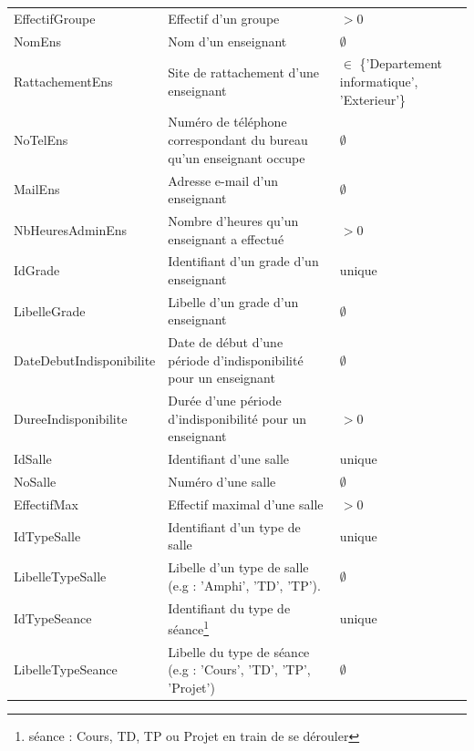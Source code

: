 \documentclass{article}
\begin{document}
\begin{tabular}{|p{4cm}|p{8cm}|p{5cm}|}
  EffectifGroupe & Effectif d'un groupe & $> 0$ \\

  NomEns & Nom d'un enseignant & $\emptyset$ \\

  RattachementEns & Site de rattachement d'une enseignant & $\in$ \{'Departement informatique', 'Exterieur'\} \\

  NoTelEns & Numéro de téléphone correspondant du bureau qu'un enseignant occupe & $\emptyset$ \\

  MailEns & Adresse e-mail d'un enseignant & $\emptyset$ \\

  NbHeuresAdminEns & Nombre d'heures qu'un enseignant a effectué & $> 0$ \\

  IdGrade & Identifiant d'un grade d'un enseignant & unique \\

  LibelleGrade & Libelle d'un grade d'un enseignant & $\emptyset$ \\

  DateDebutIndisponibilite & Date de début d'une période d'indisponibilité pour un enseignant & $\emptyset$ \\

  DureeIndisponibilite & Durée d'une période d'indisponibilité pour un enseignant & $> 0$ \\

  IdSalle & Identifiant d'une salle & unique \\

  NoSalle & Numéro d'une salle & $\emptyset$ \\

  EffectifMax & Effectif maximal d'une salle & $> 0$ \\

  IdTypeSalle & Identifiant d'un type de salle & unique \\

  LibelleTypeSalle & Libelle d'un type de salle (e.g : 'Amphi', 'TD', 'TP'). & $\emptyset$ \\

  IdTypeSeance & Identifiant du type de séance\footnote{séance : Cours, TD, TP ou Projet en train de se dérouler} & unique \\

  LibelleTypeSeance & Libelle du type de séance (e.g : 'Cours', 'TD', 'TP', 'Projet') & $\emptyset$ \\


\end{tabular}
\end{document}
